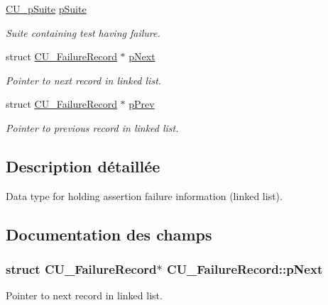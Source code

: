 \begin{DoxyCompactItemize}
\hyperlink{group__Framework_gaba832ae8b235f5e70d6a4ac9c3bb1219}{C\-U\-\_\-p\-Suite} \hyperlink{structCU__FailureRecord_a773e1afb22505c6fc487043222617731}{p\-Suite}
\begin{DoxyCompactList}\small\item\em Suite containing test having failure. \end{DoxyCompactList}\item 
struct \hyperlink{structCU__FailureRecord}{C\-U\-\_\-\-Failure\-Record} $\ast$ \hyperlink{structCU__FailureRecord_aef89a7d18b1e082202368decabe8c1f8}{p\-Next}
\begin{DoxyCompactList}\small\item\em Pointer to next record in linked list. \end{DoxyCompactList}\item 
struct \hyperlink{structCU__FailureRecord}{C\-U\-\_\-\-Failure\-Record} $\ast$ \hyperlink{structCU__FailureRecord_a617e40c3052b6b7cf3a873296ed27e56}{p\-Prev}
\begin{DoxyCompactList}\small\item\em Pointer to previous record in linked list. \end{DoxyCompactList}\end{DoxyCompactItemize}


\subsection{Description détaillée}
Data type for holding assertion failure information (linked list). 



\subsection{Documentation des champs}
\hypertarget{structCU__FailureRecord_aef89a7d18b1e082202368decabe8c1f8}{
\subsubsection[{p\-Next}]{\setlength{\rightskip}{0pt plus 5cm}struct {\bf C\-U\-\_\-\-Failure\-Record}$\ast$ C\-U\-\_\-\-Failure\-Record\-::p\-Next}}\label{structCU__FailureRecord_aef89a7d18b1e082202368decabe8c1f8}


Pointer to next record in linked list. 

